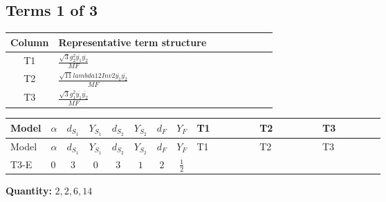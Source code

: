 \documentclass[8pt]{article}
\begin{document}
\begin{landscape}
\subsection*{Terms 1 of 3}
\begin{center}
\begin{tabular}{@{}c >{\raggedright\arraybackslash}p{0.82\linewidth}@{}}
\toprule
Column & Representative term structure \\
\midrule
T1 & \(\displaystyle \frac{\sqrt{3} g_{2}^{2} \overline{y_{1}} \overline{y_{2}}}{MF}\) \\
\midrule
T2 & \(\displaystyle \frac{\sqrt{11} lambda12Inv2 \overline{y_{1}} \overline{y_{2}}}{MF}\) \\
\midrule
T3 & \(\displaystyle \frac{\sqrt{3} g_{1}^{2} \overline{y_{1}} \overline{y_{2}}}{MF}\) \\
\midrule
\bottomrule
\end{tabular}
\end{center}
\smallskip
\tiny
\begin{longtable}{@{}llcccccc >{\raggedright\arraybackslash}p{0.21\linewidth} >{\raggedright\arraybackslash}p{0.21\linewidth} >{\raggedright\arraybackslash}p{0.21\linewidth}@{}}
\toprule
Model & $\alpha$ & $d_{S_1}$ & $Y_{S_1}$ & $d_{S_2}$ & $Y_{S_2}$ & $d_F$ & $Y_F$ & T1 & T2 & T3 \\
\midrule
\endfirsthead
\toprule
Model & $\alpha$ & $d_{S_1}$ & $Y_{S_1}$ & $d_{S_2}$ & $Y_{S_2}$ & $d_F$ & $Y_F$ & T1 & T2 & T3 \\
\midrule
\endhead
T3-E & $0$ & $3$ & $0$ & $3$ & $1$ & $2$ & $\frac{1}{2}$ & \scriptsize\adjustbox{max width=\linewidth}{$\begin{gathered} - \frac{49 \sqrt{3} g_{2}^{2} \overline{y_{1}} \overline{y_{2}}}{24 MF}\end{gathered}$} & \scriptsize\adjustbox{max width=\linewidth}{$\begin{gathered} - \frac{3 \sqrt{11} lambda12Inv2 \overline{y_{1}} \overline{y_{2}}}{22 MF}\end{gathered}$} & \scriptsize\adjustbox{max width=\linewidth}{$\begin{gathered} - \frac{\sqrt{3} g_{1}^{2} \overline{y_{1}} \overline{y_{2}}}{8 MF}\end{gathered}$} \\
\midrule
\bottomrule
\end{longtable}
\clearpage
\noindent\textbf{Quantity: }$\mathrm{2,2,6,14}$\par\smallskip

\end{landscape}
\end{document}
